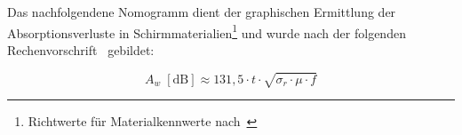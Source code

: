 

Das nachfolgendene Nomogramm dient der graphischen Ermittlung der Absorptionsverluste in Schirmmaterialien\footnote{Richtwerte für Materialkennwerte nach~\cite{Simplified_shielding}} und wurde nach der folgenden Rechenvorschrift~\cite{Simplified_shielding} gebildet:

\begin{equation}
    A_w \; \left[\text{dB}\right] \approx 131,5 \cdot t \cdot \sqrt{\sigma_r \cdot \mu \cdot f}
\end{equation}